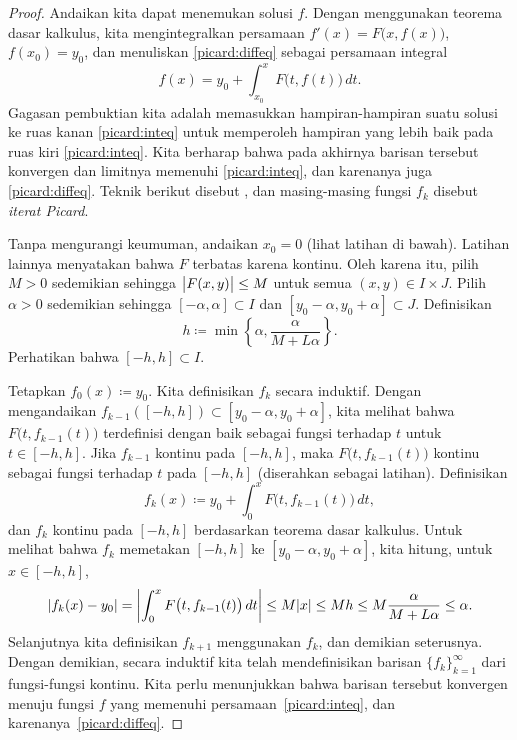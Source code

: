\begin{proof}
\pagebreak[2]
Andaikan kita dapat menemukan solusi $f$.  Dengan menggunakan teorema dasar
kalkulus, kita mengintegralkan persamaan
$f'(x) = F\bigl(x,f(x)\bigr)$, $f(x_0) = y_0$, dan menuliskan \eqref{picard:diffeq}
sebagai persamaan integral
\begin{equation} \label{picard:inteq}
f(x) = y_0 + \int_{x_0}^x F\bigl(t,f(t)\bigr)\,dt .
\end{equation}
Gagasan pembuktian kita adalah memasukkan hampiran-hampiran suatu
solusi ke ruas kanan \eqref{picard:inteq} untuk memperoleh hampiran yang lebih baik pada
ruas kiri \eqref{picard:inteq}.  Kita berharap bahwa pada akhirnya barisan tersebut
konvergen dan limitnya memenuhi
\eqref{picard:inteq}, dan karenanya juga \eqref{picard:diffeq}.
Teknik berikut disebut \emph{},
dan masing-masing fungsi $f_k$ disebut
\emph{iterat Picard}.

Tanpa mengurangi keumuman, andaikan $x_0 = 0$ (lihat latihan di bawah).
Latihan lainnya
menyatakan bahwa $F$ terbatas karena kontinu.
Oleh karena itu, pilih $M > 0$ sedemikian sehingga
$\bigl\lvert {F(x,y)} \bigr\rvert \leq M$ untuk semua $(x,y) \in I\times J$.
Pilih $\alpha > 0$ sedemikian sehingga
$[-\alpha,\alpha] \subset I$ dan $[y_0-\alpha, y_0 + \alpha] \subset J$.
Definisikan
\begin{equation*}
h \coloneqq \min \left\{ \alpha, \frac{\alpha}{M+L\alpha} \right\} .
\end{equation*}
Perhatikan bahwa
$[-h,h] \subset I$.

Tetapkan $f_0(x) \coloneqq y_0$.
Kita definisikan $f_k$ secara induktif.
Dengan mengandaikan $f_{k-1}([-h,h]) \subset [y_0-\alpha,y_0+\alpha]$,
kita melihat bahwa
$F\bigl(t,f_{k-1}(t)\bigr)$
terdefinisi dengan baik sebagai fungsi terhadap $t$ untuk $t \in [-h,h]$.
Jika $f_{k-1}$ kontinu
pada $[-h,h]$, maka
$F\bigl(t,f_{k-1}(t)\bigr)$
kontinu sebagai
fungsi terhadap $t$ pada $[-h,h]$ (diserahkan sebagai latihan).
Definisikan
\begin{equation*}
f_k(x) \coloneqq y_0+ \int_{0}^x F\bigl(t,f_{k-1}(t)\bigr)\,dt ,
\end{equation*}
dan $f_k$ kontinu pada $[-h,h]$ berdasarkan teorema dasar kalkulus.
Untuk melihat bahwa $f_k$ memetakan $[-h,h]$ ke $[y_0-\alpha,y_0+\alpha]$, kita hitung, untuk
$x \in [-h,h]$,
\begin{equation*}
\lvert {f_k(x) - y_0} \rvert = 
\left\lvert {\int_{0}^x F\bigl(t,f_{k-1}(t)\bigr)\,dt } \right\rvert
\leq
M\lvert {x} \rvert
\leq
Mh
\leq
M
\frac{\alpha}{M+L\alpha}
\leq \alpha .
\end{equation*}
Selanjutnya kita definisikan $f_{k+1}$ menggunakan $f_k$, dan demikian seterusnya.
Dengan demikian, secara induktif kita telah mendefinisikan barisan $\{ f_k \}_{k=1}^\infty$
dari fungsi-fungsi kontinu.
Kita perlu menunjukkan bahwa barisan tersebut konvergen menuju fungsi $f$ yang memenuhi
persamaan~\eqref{picard:inteq}, dan karenanya~\eqref{picard:diffeq}.


\end{proof}

